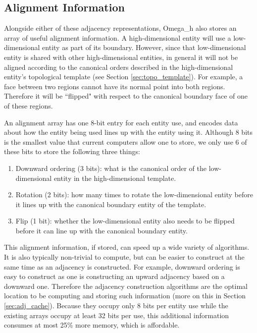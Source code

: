 \subsection{Alignment Information}
\label{sec:osh_align}

Alongside either of these adjacency representations, Omega\_h
also stores an array of useful alignment information.
A high-dimensional entity will use a low-dimensional entity
as part of its boundary. However, since that low-dimensional
entity is shared with other high-dimensional entities, in general
it will not be aligned according to the canonical orders
described in the high-dimensional entity's topological
template (see Section \ref{sec:topo_template}).
For example, a face between two regions cannot have its normal
point into both regions.
Therefore it will be ``flipped" with respect to the canonical
boundary face of one of these regions.

An alignment array has one 8-bit entry for each entity use, and encodes
data about how the entity being used lines up with the entity using it.
Although 8 bits is the smallest value that current computers allow one
to store, we only use 6 of these bits to store the following three things:
\begin{enumerate}
\item Downward ordering (3 bits): what is the canonical order of the
low-dimensional entity in the high-dimensional template.
\item Rotation (2 bits): how many times to rotate the low-dimensional
entity before it lines up with the canonical boundary
entity of the template.
\item Flip (1 bit): whether the low-dimensional entity also
needs to be flipped before it can line up with the canonical
boundary entity.
\end{enumerate}

This alignment information, if stored, can speed up a wide variety
of algorithms.
It is also typically non-trivial to compute, but can be easier
to construct at the same time as an adjacency is constructed.
For example, downward ordering is easy to construct as one
is constructing an upward adjacency based on a downward one.
Therefore the adjacency construction algorithms are the optimal
location to be computing and storing such information
(more on this in Section \ref{sec:adj_cache}).
Because they occupy only 8 bits per entity use while the
existing arrays occupy at least 32 bits per use, this additional
information consumes at most 25\% more memory, which is affordable.

